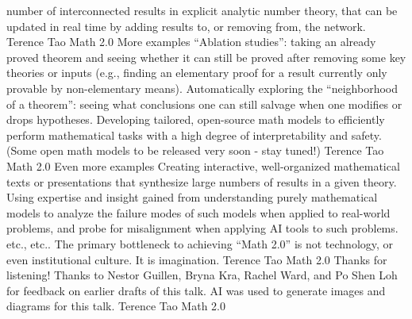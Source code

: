 number of interconnected results in explicit analytic number
theory, that can be updated in real time by adding results to, or
removing from, the network.
Terence Tao
Math 2.0
More examples
“Ablation studies”: taking an already proved theorem and
seeing whether it can still be proved after removing some
key theories or inputs (e.g., finding an elementary proof for
a result currently only provable by non-elementary means).
Automatically exploring the “neighborhood of a theorem”:
seeing what conclusions one can still salvage when one
modifies or drops hypotheses.
Developing tailored, open-source math models to
efficiently perform mathematical tasks with a high degree
of interpretability and safety. (Some open math models to
be released very soon - stay tuned!)
Terence Tao
Math 2.0
Even more examples
Creating interactive, well-organized mathematical texts or
presentations that synthesize large numbers of results in a
given theory.
Using expertise and insight gained from understanding
purely mathematical models to analyze the failure modes
of such models when applied to real-world problems, and
probe for misalignment when applying AI tools to such
problems.
etc., etc..
The primary bottleneck to achieving “Math 2.0” is not
technology, or even institutional culture. It is imagination.
Terence Tao
Math 2.0
Thanks for listening!
Thanks to Nestor Guillen, Bryna Kra, Rachel Ward, and Po
Shen Loh for feedback on earlier drafts of this talk.
AI was used to generate images and diagrams for this talk.
Terence Tao
Math 2.0

